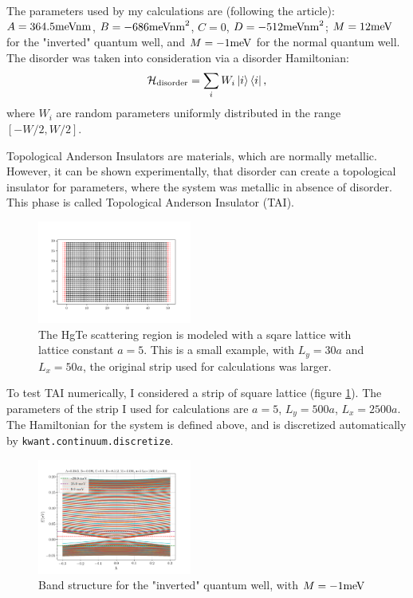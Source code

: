\documentclass[11pt, a4paper, twocolumn]{article}
\begin{document}
The parameters used by my calculations are (following the article):
$A=364.5\textnormal{meVnm}$,
$B=-686\textnormal{meVnm}^2$,
$C=0$,
$D=-512\textnormal{meVnm}^2$;
$M=12\textnormal{meV}$ for the "inverted" quantum well, and $M=-1\textnormal{meV}$ for
the normal quantum well. The disorder was taken into consideration via a disorder Hamiltonian:
\begin{equation*}
  \mathcal H_{\textrm{disorder}} = \sum\limits_i W_i \ket i \bra i \textnormal{,}
\end{equation*}
where $W_i$ are random parameters uniformly distributed in the range $[-W/2, W/2]$.

Topological Anderson Insulators are materials, which are normally metallic. However, it can be
shown experimentally, that disorder can create a topological insulator for parameters, where the system
was metallic in absence of disorder. This phase is called Topological Anderson Insulator (TAI).
\begin{figure}[H]
  \begin{center}
  \includegraphics[width=0.45\textwidth]{./media/square_lattice_W=30_L=50.png}
  \caption{The HgTe scattering region is modeled with a sqare lattice with lattice constant
  $a=5$. This is a small example, with $L_y=30a$ and $L_x=50a$, the original strip used for calculations
  was larger.}
  \label{fig:square_lattice_W=30_L=50}
  \end{center}
\end{figure}
To test TAI numerically, I considered a strip of square lattice (figure \ref{fig:square_lattice_W=30_L=50}).
The parameters of the strip I used for calculations are $a=5$, $L_y=500a$, $L_x=2500a$.
The Hamiltonian for the system is defined above, and is discretized automatically by
\texttt{kwant.continuum.discretize}.

\begin{figure}[H]
  \begin{center}
  \includegraphics[width=0.45\textwidth]{./media/bstructure_params_Lx=1500_Ly=500_M=-0_001.png}
  \caption{Band structure for the "inverted" quantum well, with $M=-1\textnormal{meV}$}
  \label{fig:bstructure_params_Lx=1500_Ly=500_M=-0_001}
  \end{center}
\end{figure}
\end{document}
